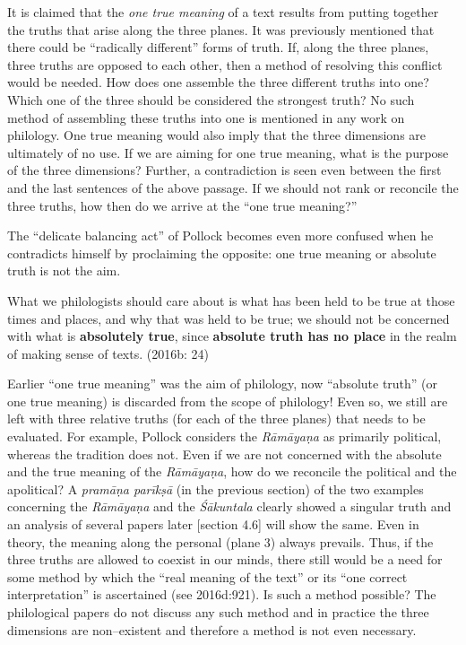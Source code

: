 It is claimed that the \textit{one true meaning} of a text results from putting together the truths that arise along the three planes. It was previously mentioned that there could be “radically different” forms of truth. If, along the three planes, three truths are opposed to each other, then a method of resolving this conflict would be needed. How does one assemble the three different truths into one? Which one of the three should be considered the strongest truth? No such method of assembling these truths into one is mentioned in any work on philology. One true meaning would also imply that the three dimensions are ultimately of no use. If we are aiming for one true meaning, what is the purpose of the three dimensions? Further, a contradiction is seen even between the first and the last sentences of the above passage. If we should not rank or reconcile the three truths, how then do we arrive at the “one true meaning?”

The “delicate balancing act” of Pollock becomes even more confused when he contradicts himself by proclaiming the opposite: one true meaning or absolute truth is not the aim.

\begin{myquote}
What we philologists should care about is what has been held to be true at those times and places, and why that was held to be true; we should not be concerned with what is \textbf{absolutely true}, since \textbf{absolute truth has no place} in the realm of making sense of texts. (2016b: 24)
\end{myquote}

Earlier “one true meaning” was the aim of philology, now “absolute truth” (or one true meaning) is discarded from the scope of philology! Even so, we still are left with three relative truths (for each of the three planes) that needs to be evaluated. For example, Pollock considers the \textit{Rāmāyaṇa} as primarily political, whereas the tradition does not. Even if we are not concerned with the absolute and the true meaning of the \textit{Rāmāyaṇa}, how do we reconcile the political and the apolitical? A \textit{pramāṇa parīkṣā} (in the previous section) of the two examples concerning the \textit{Rāmāyaṇa} and the \textit{Śākuntala }clearly showed a singular truth and an analysis of several papers later [section 4.6] will show the same. Even in theory, the meaning along the personal (plane 3) always prevails. Thus, if the three truths are allowed to coexist in our minds, there still would be a need for some method by which the “real meaning of the text” or its “one correct interpretation” is ascertained (see 2016d:921). Is such a method possible? The philological papers do not discuss any such method and in practice the three dimensions are non–existent and therefore a method is not even necessary.

